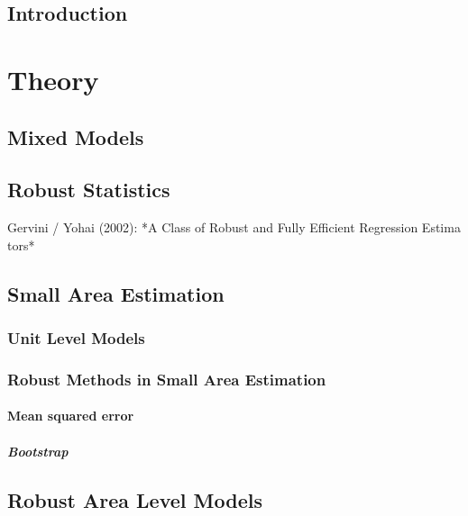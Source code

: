 % 

\chapter{Introduction}



\part{Theory}\label{part:theory}

\chapter{Mixed Models}
\chapter{Robust Statistics}
Gervini / Yohai (2002): *A Class of Robust and Fully Efficient Regression Estima
tors* \\


\chapter{Small Area Estimation}
\section{Unit Level Models}




\section{Robust Methods in Small Area Estimation}

\subsection{Mean squared error}
\subsubsection{Bootstrap}



\chapter{Robust Area Level Models}
